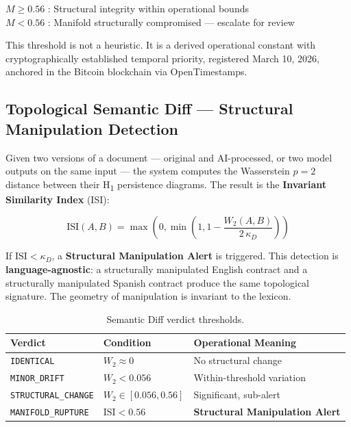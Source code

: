 \documentclass[11pt, a4paper]{article}
\begin{document}
\begin{statbox}
\centering
$M \geq 0.56$ \;:\; Structural integrity within operational bounds\\[4pt]
$M < 0.56$ \;:\; Manifold structurally compromised --- escalate for review
\end{statbox}

This threshold is not a heuristic. It is a derived operational constant with
cryptographically established temporal priority, registered March 10, 2026,
anchored in the Bitcoin blockchain via OpenTimestamps.

\subsection{Topological Semantic Diff --- Structural Manipulation Detection}

Given two versions of a document --- original and AI-processed, or two model
outputs on the same input --- the system computes the Wasserstein $p{=}2$
distance between their H\textsubscript{1} persistence diagrams. The result
is the \textbf{Invariant Similarity Index} (ISI):

\[
\mathrm{ISI}(A,B) = \max\!\left(0,\min\!\left(1,
  1 - \frac{W_2(A,B)}{2\,\kappa_D}\right)\right)
\]

If $\mathrm{ISI} < \kappa_D$, a \textbf{Structural Manipulation Alert} is
triggered. This detection is \textbf{language-agnostic}: a structurally
manipulated English contract and a structurally manipulated Spanish contract
produce the same topological signature. The geometry of manipulation is
invariant to the lexicon.

\begin{table}[H]
\centering
\caption{Semantic Diff verdict thresholds.}
\begin{tabular}{lll}
\toprule
\textbf{Verdict} & \textbf{Condition} & \textbf{Operational Meaning} \\
\midrule
\texttt{IDENTICAL} & $W_2 \approx 0$ & No structural change \\
\texttt{MINOR\_DRIFT} & $W_2 < 0.056$ & Within-threshold variation \\
\texttt{STRUCTURAL\_CHANGE} & $W_2 \in [0.056, 0.56]$ & Significant, sub-alert \\
\texttt{MANIFOLD\_RUPTURE} & $\mathrm{ISI} < 0.56$ &
  \textbf{Structural Manipulation Alert} \\
\bottomrule
\end{tabular}
\end{table}
\end{document}
